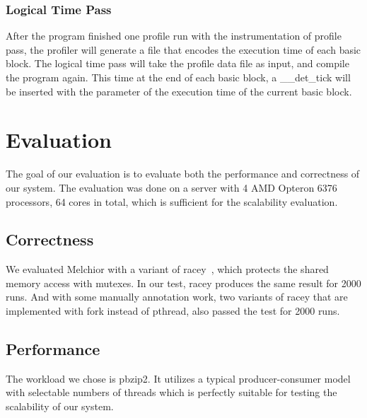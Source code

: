 \documentclass{sig-alternate}
\begin{document}
\subsubsection{Logical Time Pass}
After the program finished one profile run with the instrumentation of profile pass, the profiler will generate a file that encodes the execution time of each basic block. The logical time pass will take the profile data file as input, and compile the program again. This time at the end of each basic block, a \_\_det\_tick will be inserted with the parameter of the execution time of the current basic block.

\section{Evaluation}
The goal of our evaluation is to evaluate both the performance and correctness of our system. The evaluation was done on a server with 4 AMD Opteron 6376 processors, 64 cores in total, which is sufficient for the scalability evaluation.

\subsection{Correctness}
We evaluated Melchior with a variant of racey~\cite{hillstress}, which protects the shared memory access with mutexes. In our test, racey produces the same result for 2000 runs. And with some manually annotation work, two variants of racey that are implemented with fork instead of pthread, also passed the test for 2000 runs.

\subsection{Performance}
The workload we chose is pbzip2. It utilizes a typical producer-consumer model with selectable numbers of threads which is perfectly suitable for testing the scalability of our system.




\end{document}
